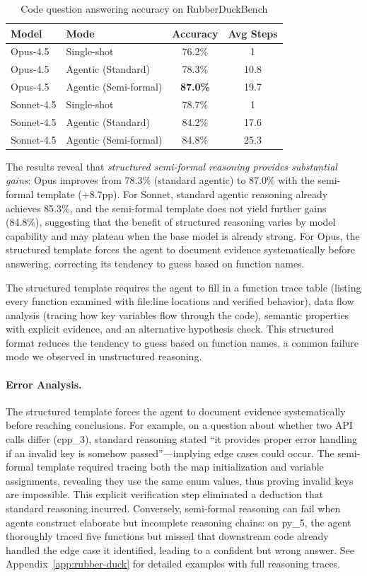 \documentclass[]{meta}
\begin{document}
\begin{table}[h]
\centering
\caption{Code question answering accuracy on RubberDuckBench}
\label{tab:rubber-duck}
\begin{tabular}{llcc}
\toprule
\textbf{Model} & \textbf{Mode} & \textbf{Accuracy} & \textbf{Avg Steps} \\
\midrule
Opus-4.5 & Single-shot & 76.2\% & 1 \\
Opus-4.5 & Agentic (Standard) & 78.3\% & 10.8 \\
Opus-4.5 & Agentic (Semi-formal) & \textbf{87.0\%} & 19.7 \\
\midrule
Sonnet-4.5 & Single-shot & 78.7\% & 1 \\
Sonnet-4.5 & Agentic (Standard) & 84.2\% & 17.6 \\
Sonnet-4.5 & Agentic (Semi-formal) & 84.8\% & 25.3 \\
\bottomrule
\end{tabular}
\end{table}

The results reveal that \emph{structured semi-formal reasoning provides substantial gains}: Opus improves from 78.3\% (standard agentic) to 87.0\% with the semi-formal template (+8.7pp). For Sonnet, standard agentic reasoning already achieves 85.3\%, and the semi-formal template does not yield further gains (84.8\%), suggesting that the benefit of structured reasoning varies by model capability and may plateau when the base model is already strong. For Opus, the structured template forces the agent to document evidence systematically before answering, correcting its tendency to guess based on function names.

The structured template requires the agent to fill in a function trace table (listing every function examined with file:line locations and verified behavior), data flow analysis (tracing how key variables flow through the code), semantic properties with explicit evidence, and an alternative hypothesis check. This structured format reduces the tendency to guess based on function names, a common failure mode we observed in unstructured reasoning.

\paragraph{Error Analysis.}
The structured template forces the agent to document evidence systematically before reaching conclusions. For example, on a question about whether two API calls differ (cpp\_3), standard reasoning stated ``it provides proper error handling if an invalid key is somehow passed''---implying edge cases could occur. The semi-formal template required tracing both the map initialization and variable assignments, revealing they use the same enum values, thus proving invalid keys are impossible. This explicit verification step eliminated a deduction that standard reasoning incurred. Conversely, semi-formal reasoning can fail when agents construct elaborate but incomplete reasoning chains: on py\_5, the agent thoroughly traced five functions but missed that downstream code already handled the edge case it identified, leading to a confident but wrong answer. See Appendix~\ref{app:rubber-duck} for detailed examples with full reasoning traces.
\end{document}
